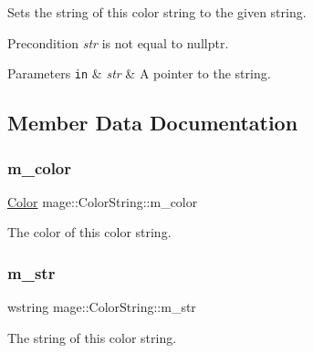 Sets the string of this color string to the given string.

\begin{DoxyPrecond}{Precondition}
{\itshape str} is not equal to {\ttfamily nullptr}. 
\end{DoxyPrecond}

\begin{DoxyParams}[1]{Parameters}
\mbox{\tt in}  & {\em str} & A pointer to the string. \\
\hline
\end{DoxyParams}


\subsection{Member Data Documentation}
\hypertarget{structmage_1_1_color_string_a3f351c61281fc49786bc13842527d2a3}{}\label{structmage_1_1_color_string_a3f351c61281fc49786bc13842527d2a3} 
\subsubsection{\texorpdfstring{m\+\_\+color}{m\_color}}
{\footnotesize\ttfamily \hyperlink{structmage_1_1_color}{Color} mage\+::\+Color\+String\+::m\+\_\+color\hspace{0.3cm}{\ttfamily [private]}}

The color of this color string. \hypertarget{structmage_1_1_color_string_a9eb840afa5112cd611f5bb1b21edc045}{}\label{structmage_1_1_color_string_a9eb840afa5112cd611f5bb1b21edc045} 
\subsubsection{\texorpdfstring{m\+\_\+str}{m\_str}}
{\footnotesize\ttfamily wstring mage\+::\+Color\+String\+::m\+\_\+str\hspace{0.3cm}{\ttfamily [private]}}

The string of this color string. 
